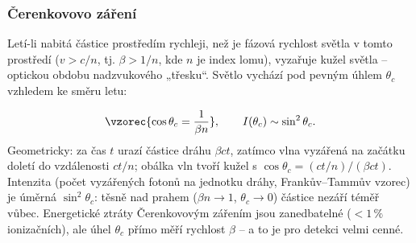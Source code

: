\subsubsection{Čerenkovovo záření}
Letí-li nabitá částice prostředím rychleji, než je fázová rychlost světla
v tomto prostředí (\(v > c/n\), tj. \(\beta > 1/n\), kde \(n\) je index lomu),
vyzařuje kužel světla – optickou obdobu nadzvukového „třesku``. Světlo
vychází pod pevným úhlem \(\theta_c\) vzhledem ke směru letu:

\begin{center}
\end{center}

\[
  \vzorec{\cos\theta_c = \frac{1}{\beta n}}, \qquad I(\theta_c) \sim \sin^2\theta_c .
\]
Geometricky: za čas \(t\) urazí částice dráhu \(\beta c t\), zatímco vlna
vyzářená na začátku doletí do vzdálenosti \(ct/n\); obálka vln tvoří kužel
s \(\cos\theta_c = (ct/n)/(\beta ct)\). Intenzita (počet vyzářených fotonů na
jednotku dráhy, Frankův–Tammův vzorec) je úměrná \(\sin^2\theta_c\): těsně nad
prahem (\(\beta n \to 1\), \(\theta_c\to 0\)) částice nezáří téměř vůbec.
Energetické ztráty Čerenkovovým zářením jsou zanedbatelné (\(<1\,\%\)
ionizačních), ale úhel \(\theta_c\) přímo měří rychlost \(\beta\) – a to je
pro detekci velmi cenné.

